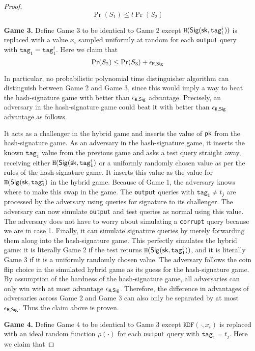 \documentclass[12pt]{article}
\begin{document}
\begin{proof}
$$
\Pr(S_1) \le l \Pr(S_2)
$$


\noindent \textbf{Game 3.} Define Game 3 to be identical to Game 2 except $\texttt{H}(\mathsf{Sig}(\mathsf{sk}, \texttt{tag}_1^i))$ is replaced with a value $x_i$ sampled uniformly at random for each  \texttt{output} query with $\texttt{tag}_1 = \texttt{tag}_1^i$. Here we claim that
$$\Pr(S_2) \le  \Pr(S_3) + \epsilon_{\texttt{H}, \mathsf{Sig}}$$

In particular, no probabilistic polynomial time distinguisher algorithm can distinguish between Game 2 and Game 3, since this would imply a way to beat the hash-signature game with better than $\epsilon_{\texttt{H}, \mathsf{Sig}}$ advantage. Precisely, an adversary in the hash-signature game could beat it with better than $\epsilon_{\texttt{H}, \mathsf{Sig}}$ advantage as follows. 

It acts as a challenger in the hybrid game and inserts the value of $\mathsf{pk}$ from the hash-signature game. As an adversary in the hash-signature game, it inserts the known $\texttt{tag}_1$ value from the previous game and asks a test query straight away, receiving either $ \texttt{H}(\mathsf{Sig} (\mathsf{sk}, \texttt{tag}_1^i)$ or a uniformly randomly chosen value as per the rules of the hash-signature game. It inserts this value as the value for $ \texttt{H}(\mathsf{Sig} (\mathsf{sk}, \texttt{tag}_1^i)$ in the hybrid game. Because of Game 1, the adversary knows where to make this swap in the game. The \texttt{output} queries with $\texttt{tag}_1 \neq t_j$ are processed by the adversary using queries for signature to its challenger.  The adversary can now simulate \texttt{output} and test queries as normal using this value. The adversary does not have to worry about simulating a \texttt{corrupt} query because we are in case 1. Finally, it can simulate signature queries by merely forwarding them along into the hash-signature game. This perfectly simulates the hybrid game: it is literally Game 2 if the test returns $ \texttt{H}(\mathsf{Sig} (\mathsf{sk}, \texttt{tag}_1^i))$, and it is literally Game 3 if it is a uniformly randomly chosen value. The adversary follows the coin flip choice in the simulated hybrid game as its guess for the hash-signature game. By assumption of the hardness of the hash-signature game, all adversaries can only win with at most advantage $\epsilon_{\texttt{H}, \mathsf{Sig}}$. Therefore, the difference in advantages of adversaries across Game 2 and Game 3 can also only be separated by at most $\epsilon_{\texttt{H}, \mathsf{Sig}}$. Thus the claim above is proven.

\noindent \textbf{Game 4.} Define Game 4 to be identical to Game 3 except 
$\texttt{KDF}(\cdot, x_i)$ is replaced with an ideal random function $\rho(\cdot)$ for each \texttt{output} query with $\texttt{tag}_1 =t_j$. Here we claim that


\end{proof}
\end{document}
